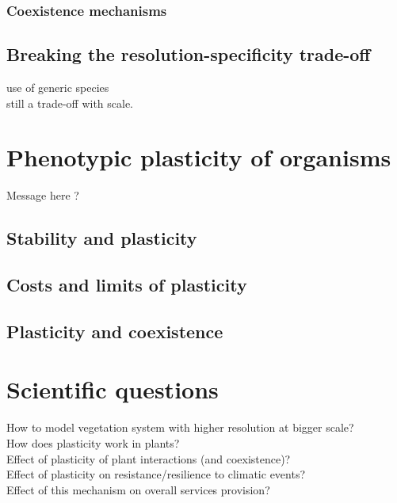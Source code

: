 \subsection{Coexistence mechanisms}

\section{Breaking the resolution-specificity trade-off}
use of generic species\\
still a trade-off with scale.

\chapter{Phenotypic plasticity of organisms}
Message here ?

\section{Stability and plasticity}

\section{Costs and limits of plasticity}

\section{Plasticity and coexistence}


\chapter*{Scientific questions}
How to model vegetation system with higher resolution at bigger scale?\\
How does plasticity work in plants?\\
Effect of plasticity of plant interactions (and coexistence)?\\
Effect of plasticity on resistance/resilience to climatic events?\\
Effect of this mechanism on overall services provision?




